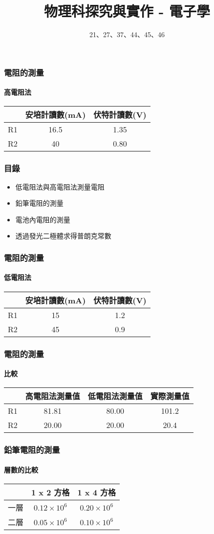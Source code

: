\documentclass{beamer}
\begin{document}
\title{物理科探究與實作 - 電子學}
\author{21、27、37、44、45、46}

\frame{\titlepage}

\centering
\begin{frame}
	\frametitle{電阻的測量}
	\framesubtitle{高電阻法}
	\begin{tabular}{|c|c|c|}
		\hline
		& 安培計讀數(mA) & 伏特計讀數(V) \\
		\hline
		R1 & 16.5 & 1.35 \\
		\hline
		R2 & 40 & 0.80 \\
		\hline
	\end{tabular}
\end{frame}

\begin{frame}
	\frametitle{目錄}
	\begin{itemize}
		\item 低電阻法與高電阻法測量電阻
		\item 鉛筆電阻的測量
		\item 電池內電阻的測量
		\item 透過發光二極體求得普朗克常數
	\end{itemize}
\end{frame}

\begin{frame}
	\frametitle{電阻的測量}
	\framesubtitle{低電阻法}
	\begin{tabular}{|c|c|c|}
		\hline
		& 安培計讀數(mA) & 伏特計讀數(V) \\
		\hline
		R1 & 15 & 1.2 \\
		\hline
		R2 & 45 & 0.9 \\
		\hline
	\end{tabular}
\end{frame}

\begin{frame}
	\frametitle{電阻的測量}
	\framesubtitle{比較}
	\begin{tabular}{|c|c|c|c|}
		\hline
		& 高電阻法測量值 & 低電阻法測量值 & 實際測量值 \\
		\hline
		R1 & 81.81 & 80.00 & 101.2 \\
		\hline
		R2 & 20.00 & 20.00 & 20.4 \\
		\hline
	\end{tabular}
\end{frame}

\begin{frame}
	\frametitle{鉛筆電阻的測量}
	\framesubtitle{層數的比較}
	\begin{tabular}{|c|c|c|}
		\hline
		& 1 x 2 方格 & 1 x 4 方格  \\
		\hline
		一層 & $0.12 \times 10^6$ & $0.20 \times 10^6$  \\
		\hline
		二層 & $0.05 \times 10^6$ & $0.10 \times 10^6$  \\
		\hline
	\end{tabular}
\end{frame}
\end{document}
